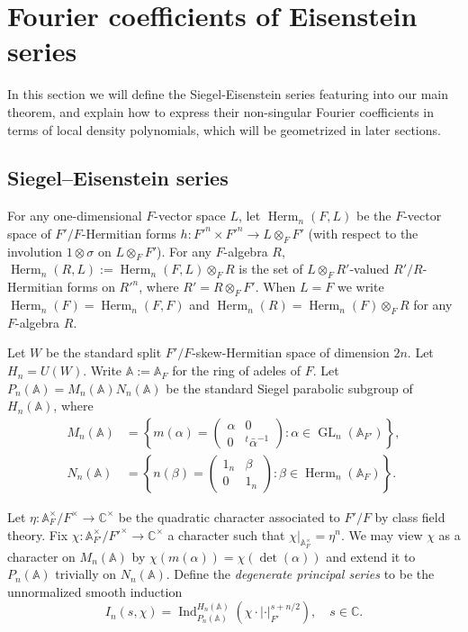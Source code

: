 \documentclass[reqno]{amsart}
\numberwithin{equation}{section}
\newcommand{\BA}{\ensuremath{\mathbb{A}}\xspace}
\DeclareMathOperator{\GL}{GL}
\DeclareMathOperator{\Ind}{Ind}
\DeclareMathOperator{\Herm}{Herm}
\newcommand\ot{\otimes}
\newcommand{\s}{\sigma}
\theoremstyle{remark}
\numberwithin{equation}{section}
\begin{document}
\section{Fourier coefficients of Eisenstein series}\label{s:Eis}

In this section we will define the Siegel-Eisenstein series featuring into our main theorem, and explain how to express their non-singular Fourier coefficients in terms of local density polynomials, which will be geometrized in later sections. 


\subsection{Siegel--Eisenstein series}\label{ss:Eis} 
For any one-dimensional $F$-vector space $L$, let $\Herm_{n}(F,L)$ be the $F$-vector space of $F'/F$-Hermitian forms $h: F'^{n}\times F'^{n}\to L\ot_{F}F'$ (with respect to the involution $1\ot\s$ on $L\ot_{F}F'$). For any $F$-algebra $R$, $\Herm_{n}(R, L):=\Herm_{n}(F,L)\ot_{F}R$ is the set of $L\ot_{F}R'$-valued $R'/R$-Hermitian forms on $R'^{n}$, where $R'=R\ot_{F}F'$.  When $L=F$ we write $\Herm_{n}(F)=\Herm_{n}(F,F)$ and $\Herm_{n}(R)=\Herm_{n}(F)\ot_F R$ for any $F$-algebra $R$.

Let $W$ be the standard split $F'/F$-skew-Hermitian space of dimension $2n$. 
Let $H_n=U(W)$. Write $\BA := \BA_F$ for the ring of adeles of $F$. Let $P_n(\BA)=M_n(\BA)N_n(\BA)$ be the standard Siegel parabolic subgroup of $H_n(\BA)$, where
\begin{align*}
  M_n(\BA)&=\left\{m(\alpha)=\begin{pmatrix}\alpha & 0\\0 &{}^t\bar \alpha^{-1}\end{pmatrix}: \alpha\in \GL_n(\BA_{F'})\right\},\\
  N_n(\BA) &= \left\{n(\beta)=\begin{pmatrix} 1_n & \beta \\0 & 1_n\end{pmatrix}: \beta\in\Herm_n(\BA_F)\right\}.
\end{align*}

Let $\eta: \BA_{F}^\times/F^\times\rightarrow \mathbb{C}^\times$ be the quadratic character associated to $F'/F$ by class field theory. Fix $\chi: \BA_{F'}^\times/F'^\times\rightarrow \mathbb{C}^\times$ a character such that $\chi|_{\BA_F^\times}=\eta^n$. We may view $\chi$ as a character on $M_n(\BA)$ by $\chi(m(\alpha))=\chi(\det(\alpha))$ and extend it to $P_n(\BA)$ trivially on $N_n(\BA)$. Define the \emph{degenerate principal series} to be the unnormalized smooth induction 
$$
I_n(s,\chi)=\Ind_{P_n(\BA)}^{H_n(\BA)}(\chi\cdot |\cdot|_{F'}^{s+n/2}),\quad s\in \mathbb{C}.
$$
\end{document}
